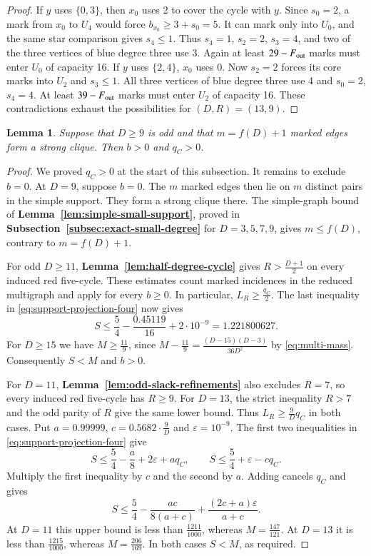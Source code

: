 \documentclass[preprint,11pt,numbers]{elsarticle-arxiv}
\numberwithin{equation}{section}
\newtheorem{lemma}[theorem]{Lemma}
\theoremstyle{definition}
\begin{document}
\begin{proof}
If $y$ uses $\{0,3\}$, then $x_0$ uses 2 to cover the cycle with
$y$. Since $s_0=2$, a mark from $x_0$ to $U_4$ would force
$b_{x_0}\ge3+s_0=5$. It can mark only into $U_0$, and the same
star comparison gives $s_4\le1$. Thus $s_4=1$, $s_2=2$, $s_3=4$,
and two of the three vertices of blue degree three use 3. Again
at least $29-F_{\rm out}$ marks must enter $U_0$ of capacity 16.
If $y$ uses $\{2,4\}$, $x_0$ uses 0. Now $s_2=2$ forces its
core marks into $U_2$ and $s_3\le1$. All three vertices of blue
degree three use 4 and $s_0=2$, $s_4=4$. At least $39-F_{\rm out}$
marks must enter $U_2$ of capacity 16. These contradictions exhaust
the possibilities for $(D,R)=(13,9)$.

\end{proof}

\begin{lemma}\label{lem:extra-copy-required}\label{lem:counterexample-cycle}
Suppose that $D\geq9$ is odd and that $m=f(D)+1$ marked edges form
a strong clique. Then $b>0$ and $q_C>0$.
\end{lemma}

\begin{proof}
We proved $q_C>0$ at the start of this subsection. It remains to
exclude $b=0$. At $D=9$, suppose $b=0$. The $m$ marked edges then lie
on $m$ distinct pairs in the simple support. They form a strong
clique there. The simple-graph bound of
\textbf{Lemma~\ref{lem:simple-small-support}}, proved in
\textbf{Subsection~\ref{subsec:exact-small-degree}} for $D=3,5,7,9$,
gives $m\leq f(D)$, contrary to $m=f(D)+1$.

For odd $D\geq11$, \textbf{Lemma~\ref{lem:half-degree-cycle}}
gives $R>\frac{D+1}{2}$ on every
induced red five-cycle. These estimates count marked incidences in
the reduced multigraph and apply for every $b\geq0$. In particular,
$L_R\geq\frac{q_C}{2}$. The last inequality
in \eqref{eq:support-projection-four} now gives
\[
 S\leq\frac{5}{4}-\frac{0.45119}{16}+2\cdot10^{-9}
   =1.221800627.
\]
For $D\geq15$ we have $M\geq\frac{11}{9}$, since
$M-\frac{11}{9}=\frac{(D-15)(D-3)}{36D^2}$ by
\eqref{eq:multi-mass}. Consequently $S<M$ and $b>0$.

For $D=11$, \textbf{Lemma~\ref{lem:odd-slack-refinements}}
also excludes $R=7$, so every induced red five-cycle has $R\geq9$.
For $D=13$, the strict inequality $R>7$ and the odd parity of $R$
give the same lower bound. Thus $L_R\geq\frac{9}{D}q_C$ in both
cases. Put $a=0.99999$, $c=0.5682\cdot\frac{9}{D}$ and
$\varepsilon=10^{-9}$. The first two inequalities
in \eqref{eq:support-projection-four} give
\[
 S\leq\frac{5}{4}-\frac{a}{8}+2\varepsilon+a q_C,
 \qquad
 S\leq\frac{5}{4}+\varepsilon-c q_C .
\]
Multiply the first inequality by $c$ and the second by $a$.
Adding cancels $q_C$ and gives
\[
 S\leq\frac{5}{4}-\frac{ac}{8(a+c)}
             +\frac{(2c+a)\varepsilon}{a+c}.
\]
At $D=11$ this upper bound is less than $\frac{1211}{1000}$, whereas
$M=\frac{147}{121}$. At $D=13$ it is less than $\frac{1215}{1000}$,
whereas $M=\frac{206}{169}$. In both cases $S<M$, as required.
\end{proof}
\end{document}
